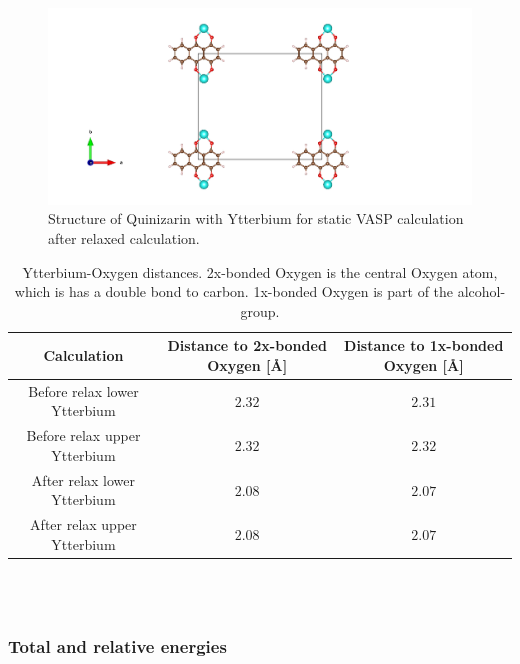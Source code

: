 \documentclass{article}
\begin{document}
      \begin{figure}[H]
        \centering
        \includegraphics[width = \textwidth]{../fig/Yb_staticafter_CONTCAR.png}
        \caption{Structure of Quinizarin with Ytterbium for static VASP calculation after relaxed calculation. }
        \label{fig:Yb_staticafter_CONTCAR}
      \end{figure}

      \begin{table}[H]
        \centering
        \caption{Ytterbium-Oxygen distances. 2x-bonded Oxygen is the central Oxygen atom, which is has a double bond to carbon. 1x-bonded Oxygen is part of the alcohol-group. }
        \label{tab:neighborYb}
        \begin{tabular}{|c|c|c|}
            \hline
            Calculation & Distance to 2x-bonded Oxygen [Å] & Distance to 1x-bonded Oxygen [Å]  \\
            \hline \hline
            Before relax lower Ytterbium & $2.32$ & $2.31$ \\
            Before relax upper Ytterbium & $2.32$ & $2.32$ \\
            After relax lower Ytterbium & $2.08$ & $2.07$ \\
            After relax upper Ytterbium & $2.08$ & $2.07$ \\
            \hline
        \end{tabular} \\
        \hspace{0pt}\\
      \end{table}


      \vspace{1cm}

    \subsubsection{Total and relative energies}
\end{document}
